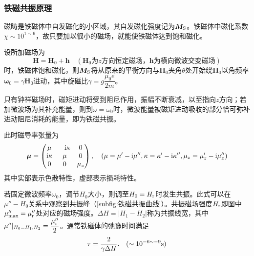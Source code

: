 	\subsubsection{铁磁共振原理} %
		\label{ssub:铁磁共振原理}
		\par 磁畴是铁磁体中自发磁化的小区域，其自发磁化强度记为$\boldsymbol{M}_{\rm S}$。铁磁体中磁化系数$\chi\sim 10^{1\sim 6}$，故只要加以很小的磁场，就能使铁磁体达到饱和磁化。
		\par 设所加磁场为
		\begin{equation}
			\boldsymbol{H}=\boldsymbol{H}_0+\boldsymbol{h}\quad (\boldsymbol{H}_0\text{为}z\text{方向恒定磁场，}\boldsymbol{h}\text{为横向微波交变磁场})
		\end{equation}
		时，铁磁体饱和磁化，则$\boldsymbol{M}_{\rm S}$将从原来的平衡方向与$\boldsymbol{H}_0$夹角$\theta$处开始绕$\boldsymbol{H}_0$以角频率$\boldsymbol{\omega}_0=\gamma\boldsymbol{H}_0$进动，其中旋磁比$\gamma = g\dfrac{\mu_0 e}{2m}$。
		\par 只有钟祥磁场时，磁矩进动将受到阻尼作用，振幅不断衰减，以至指向$z$方向；若加微波场为其补充能量，则到$\omega = \omega_0$时，微波能量被磁矩进动吸收的部分恰可弥补进动阻尼消耗的能量，即为铁磁共振。
		\par 此时磁导率张量为
		\begin{equation}
			\boldsymbol{\mu}=
			\begin{pmatrix}
				\mu & -\mathrm{i}\kappa & 0 \\
				\mathrm{i}\kappa & \mu & 0 \\
				 0 & 0 & \mu_z \\
			\end{pmatrix},
			\quad (\mu = \mu'-{\rm i}\mu'',\kappa = \kappa'-{\rm i}\kappa'',\mu_z = \mu_z'-{\rm i}\mu_z'')
		\end{equation}
		其中实部表示色散特性，虚部表示损耗特性。
		\par 若固定微波频率$\omega_0$，调节$H_0$大小，则调至$H_0=H_{\rm r}$时发生共振。此式可以在$\mu''-H_0$关系中观察到共振峰（\cref{subfig:铁磁共振曲线}）。共振磁场强度$H_{\rm r}$即图中$\mu''_{\rm max}=\mu''_{\rm r}$处对应的磁场强度。$\Delta H = |H_1-H_2|$称为共振线宽，其中$\mu''|_{H_0=H_1,H_2}=\dfrac{\mu''_{\rm r}}{2}$。通常铁磁体的弛豫时间满足
		\begin{equation}
			\tau = \dfrac{2}{\gamma \Delta H}.\quad (\sim 10^{-6 \sim -9}{\rm s})
		\end{equation}
